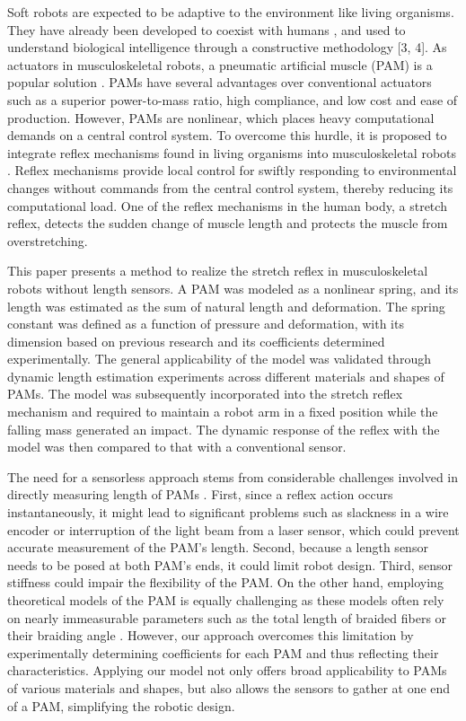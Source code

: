 Soft robots are expected to be adaptive to the environment like living organisms\cite{rus_design_2015}. They have already been developed to coexist with humans \cite{Compac}, and used to understand biological intelligence through a constructive methodology [3, 4]. As actuators in musculoskeletal robots, a pneumatic artificial muscle (PAM) is a popular solution \cite{mirvakili_artificial}. PAMs have several advantages over conventional actuators such as a superior power-to-mass ratio\cite{Dynamic}, high compliance\cite{SDCharacteristics}, and low cost and ease of production\cite{ashwin_survey_2018}.
However, PAMs are nonlinear, which places heavy computational demands on a central control system.
To overcome this hurdle, it is proposed to integrate reflex mechanisms found in living organisms into musculoskeletal robots \cite{takahashi}.
Reflex mechanisms provide local control for swiftly responding to environmental changes without commands from the central control system, thereby reducing its computational load. 
One of the reflex mechanisms in the human body, a stretch reflex, detects the sudden change of muscle length \cite{kandel} and protects the muscle from overstretching.

This paper presents a method to realize the stretch reflex in musculoskeletal robots without length sensors. A PAM was modeled as a nonlinear spring, and its length was estimated as the sum of natural length and deformation. The spring constant was defined as a function of pressure and deformation, with its dimension based on previous research and its coefficients determined experimentally. The general applicability of the model was validated through dynamic length estimation experiments across different materials and shapes of PAMs. The model was subsequently incorporated into the stretch reflex mechanism and required to maintain a robot arm in a fixed position while the falling mass generated an impact. The dynamic response of the reflex with the model was then compared to that with a conventional sensor. 

The need for a sensorless approach stems from considerable challenges involved in directly measuring length of PAMs \cite{nakajima}.
First, since a reflex action occurs instantaneously, it might lead to significant problems such as slackness in a wire encoder or interruption of the light beam from a laser sensor, 
which could prevent accurate measurement of the PAM's length. 
Second, because a length sensor needs to be posed at both PAM's ends, it could limit robot design. 
Third, sensor stiffness could impair the flexibility of the PAM. On the other hand, employing theoretical models of the PAM is equally challenging as these models often rely on nearly immeasurable parameters such as the total length of braided fibers or their braiding angle \cite{motion}. However, our approach overcomes this limitation by experimentally determining coefficients for each PAM and thus reflecting their characteristics. Applying our model not only offers broad applicability to PAMs of various materials and shapes, but also allows the sensors to gather at one end of a PAM, simplifying the robotic design. 



